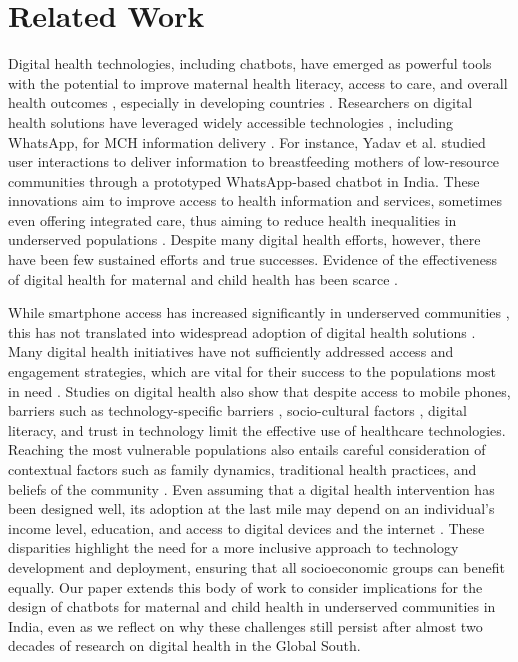 \section{Related Work} 
Digital health technologies, including chatbots, have emerged as powerful tools with the potential to improve maternal health literacy, access to care, and overall health outcomes \cite{b6,b7,b17}, especially in developing countries \cite{b18}. Researchers on digital health solutions have leveraged widely accessible technologies \cite{b24}, including WhatsApp, for MCH information delivery \cite{b6}. For instance, Yadav et al. studied \cite{22} user interactions to deliver information to breastfeeding mothers of low-resource communities through a prototyped WhatsApp-based chatbot in India.
These innovations aim to improve access to health information and services, sometimes even offering integrated care, thus aiming to reduce health inequalities in underserved populations \cite{b9}. 
Despite many digital health efforts, however, there have been few sustained efforts and true successes. Evidence of the effectiveness of digital health for maternal and child health has been scarce \cite{b25}.

While smartphone access has increased significantly in underserved communities \cite{b4}, this has not translated into widespread adoption of digital health solutions \cite{b19}.
Many digital health initiatives have not sufficiently addressed access and engagement strategies, which are vital for their success to the populations most in need \cite{b11}. 
Studies on digital health also show that despite access to mobile phones, barriers such as technology-specific barriers \cite{20}, socio-cultural factors \cite{21}, digital literacy, and trust in technology \cite{b19} limit the effective use of healthcare technologies. 
Reaching the most vulnerable populations also entails careful consideration of contextual factors such as family dynamics, traditional health practices, and beliefs of the community \cite{22}. 
Even assuming that a digital health intervention has been designed well, its adoption at the last mile may depend on an individual's income level, education, and access to digital devices and the internet \cite{b10}.  
These disparities highlight the need for a more inclusive approach to technology development and deployment, ensuring that all socioeconomic groups can benefit equally. 
Our paper extends this body of work to consider implications for the design of chatbots for maternal and child health in underserved communities in India, even as we reflect on why these challenges still persist after almost two decades of research on digital health in the Global South. 
 
